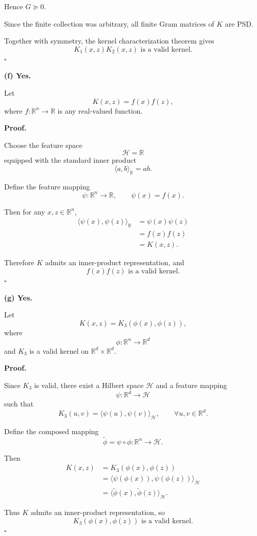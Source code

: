 \documentclass[11pt]{article}
\begin{document}
Hence $G\succeq0$.

Since the finite collection was arbitrary,
all finite Gram matrices of $K$ are PSD.

Together with symmetry, the kernel characterization
theorem gives
\[
\boxed{
K_1(x,z)K_2(x,z)\text{ is a valid kernel.}
}
\]
\hfill$\square$

\bigskip
\noindent\textbf{(f) Yes.}

Let
\[
K(x,z)=f(x)f(z),
\]
where $f:\mathbb R^n\to\mathbb R$ is any real-valued
function.

\textbf{Proof.}

Choose the feature space
\[
\mathcal H=\mathbb R
\]
equipped with the standard inner product
\[
\langle a,b\rangle_{\mathbb R}=ab.
\]

Define the feature mapping
\[
\psi:\mathbb R^n\to\mathbb R,
\qquad
\psi(x)=f(x).
\]

Then for any $x,z\in\mathbb R^n$,
\[
\begin{aligned}
\langle\psi(x),\psi(z)\rangle_{\mathbb R}
&=\psi(x)\psi(z)\\
&=f(x)f(z)\\
&=K(x,z).
\end{aligned}
\]

Therefore $K$ admits an inner-product representation,
and
\[
\boxed{f(x)f(z)\text{ is a valid kernel.}}
\]
\hfill$\square$

\bigskip
\noindent\textbf{(g) Yes.}

Let
\[
K(x,z)=K_3(\phi(x),\phi(z)),
\]
where
\[
\phi:\mathbb R^n\to\mathbb R^d
\]
and $K_3$ is a valid kernel on
$\mathbb R^d\times\mathbb R^d$.

\textbf{Proof.}

Since $K_3$ is valid, there exist a Hilbert space
$\mathcal H$ and a feature mapping
\[
\psi:\mathbb R^d\to\mathcal H
\]
such that
\[
K_3(u,v)
=
\langle\psi(u),\psi(v)\rangle_{\mathcal H},
\qquad \forall u,v\in\mathbb R^d.
\]

Define the composed mapping
\[
\widetilde\phi
=
\psi\circ\phi:
\mathbb R^n\to\mathcal H.
\]

Then
\[
\begin{aligned}
K(x,z)
&=K_3(\phi(x),\phi(z))\\
&=
\langle
\psi(\phi(x)),\psi(\phi(z))
\rangle_{\mathcal H}\\
&=
\langle
\widetilde\phi(x),\widetilde\phi(z)
\rangle_{\mathcal H}.
\end{aligned}
\]

Thus $K$ admits an inner-product representation,
so
\[
\boxed{
K_3(\phi(x),\phi(z))\text{ is a valid kernel.}
}
\]
\hfill$\square$
\end{document}
